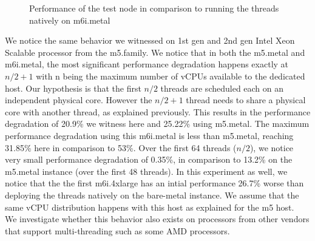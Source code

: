 \begin{figure}[H]
\caption{Performance of the test node in comparison to running the threads natively on m6i.metal}
\end{figure}
\noindent
We notice the same behavior we witnessed on 1st gen and 2nd gen Intel Xeon Scalable processor from the 
m5.family. We notice that in both the m5.metal and m6i.metal, the most significant performance degradation 
happens exactly at    \begin{math}n / 2 + 1\end{math} with n being the maximum number of vCPUs available 
to the dedicated host. Our hypothesis is that the first \begin{math}n/2\end{math} threads are scheduled 
each on an independent physical core. However the \begin{math}n / 2 + 1\end{math} thread needs to share 
a physical core with another thread, as explained previously. This results in the performance degradation 
of 20.9\% we witness here and 25.22\% using m5.metal. The maximum performance degradation using this 
m6i.metal is less than m5.metal, reaching 31.85\% here in comparison to 53\%. Over the first 64 
threads (\begin{math}n/2\end{math}), we notice very small performance degradation of 0.35\%, in 
comparison to 13.2\% on the m5.metal instance (over the first 48 threads). In this experiment as well, 
we notice that the the first m6i.4xlarge has an intial performance 26.7\% worse than deploying the 
threads natively on the bare-metal instance. We assume that the same vCPU distribution happens with this 
host as explained for the m5 host. \\
We investigate whether this behavior also exists on processors from other vendors 
that support multi-threading such as some AMD processors.
